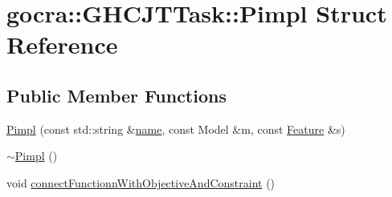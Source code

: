\hypertarget{structgocra_1_1GHCJTTask_1_1Pimpl}{}\section{gocra\+:\+:G\+H\+C\+J\+T\+Task\+:\+:Pimpl Struct Reference}
\label{structgocra_1_1GHCJTTask_1_1Pimpl}
\subsection*{Public Member Functions}
\begin{DoxyCompactItemize}
\item 
\hyperlink{structgocra_1_1GHCJTTask_1_1Pimpl_ad413aad5c0e13b459b10d16dc91c8579}{Pimpl} (const std\+::string \&\hyperlink{structgocra_1_1GHCJTTask_1_1Pimpl_a62bf1c09164be6cf8a48360bd6e53d64}{name}, const Model \&m, const \hyperlink{classocra_1_1Feature}{Feature} \&s)
\item 
\hyperlink{structgocra_1_1GHCJTTask_1_1Pimpl_a40a8c393004df9cb06d2cacf7a60b55f}{$\sim$\+Pimpl} ()
\item 
void \hyperlink{structgocra_1_1GHCJTTask_1_1Pimpl_aeedb4e2ac7e5dc4b68655b124ee8ed58}{connect\+Functionn\+With\+Objective\+And\+Constraint} ()
\end{DoxyCompactItemize}
